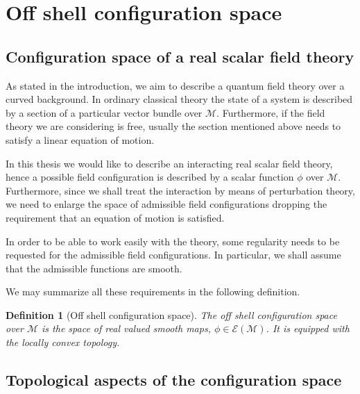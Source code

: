 \documentclass[11pt]{book}
\newcommand{\Ecal}{\mathcal{E}}
\newcommand{\Mcal}{\mathcal{M}}
\theoremstyle{break}
\newtheorem{definition}{Definition}[chapter]
\begin{document}
\section{Off shell configuration space}


\subsection{Configuration space of a real scalar field theory}


As stated in the introduction, we aim to describe a quantum field theory over a curved background. In ordinary classical theory the state of a system is described by a section of a particular vector bundle over $\Mcal$. Furthermore, if the field theory we are considering is free, usually the section mentioned above needs to satisfy a linear equation of motion.


In this thesis we would like to describe an interacting real scalar field theory, hence a possible field configuration is described by a scalar function $\phi$ over $\Mcal$. Furthermore, since we shall treat the interaction by means of perturbation theory, we need to enlarge the space of admissible field configurations dropping the requirement that an equation of motion is satisfied.


In order to be able to work easily with the theory, some regularity needs to be requested for the admissible field configurations. In particular, we shall assume that the admissible functions are smooth.   


We may summarize all these requirements in the following definition.


\begin{definition}[Off shell configuration space]\label{def:config_space}
The off shell configuration space over $\Mcal$ is the space of real valued smooth maps, $\phi \in \Ecal(\Mcal)$. It is equipped with the locally convex topology.
\end{definition}


\subsection{Topological aspects of the configuration space}
\end{document}
